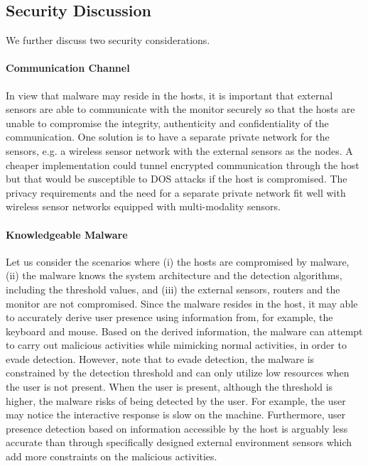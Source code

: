 %

\subsection{Security Discussion}

We further discuss two security considerations.

\paragraph{Communication Channel}

In view that malware may reside in the hosts,
it is important that external sensors are able to communicate with
the monitor securely so that the hosts are unable to compromise
the integrity, authenticity and confidentiality of the communication.
One solution is to have a separate private network for the sensors,
e.g. a wireless sensor network with the external sensors as the nodes.
A cheaper implementation could tunnel encrypted communication
through the host but that would be susceptible to DOS attacks if
the host is compromised.
The privacy requirements and the need for a separate private
network fit well with wireless sensor networks equipped with
multi-modality sensors.

\paragraph{Knowledgeable Malware}

Let us consider the scenarios where
(i) the hosts are compromised by malware,
(ii) the malware knows the system architecture and the detection algorithms,
including the threshold values, and
(iii) the external sensors, routers and the monitor are not compromised.
Since the malware resides in the host, it may able
to accurately derive user presence using information from, for example,
the keyboard and mouse.
Based on the derived information, the malware can attempt
to carry out malicious activities while mimicking normal activities, in order
to evade detection.
However, note that to evade detection, the malware is
constrained by the detection threshold and can only utilize low resources when
the user is not present.
When the user is present, although the threshold is
higher, the malware risks of being detected by the user.
For example, the
user may notice the interactive response is slow on the machine.
Furthermore, user presence detection based on information accessible 
by the host is arguably less accurate than through specifically 
designed external environment
sensors which add more constraints on the malicious activities.
